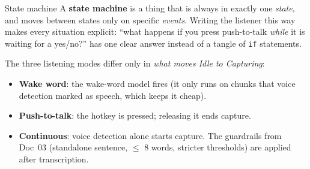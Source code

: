 \documentclass[11pt,a4paper]{article}
\begin{document}
\begin{concept}{State machine}
A \textbf{state machine} is a thing that is always in exactly one \emph{state}, and moves
between states only on specific \emph{events}. Writing the listener this way makes every
situation explicit: ``what happens if you press push-to-talk \emph{while} it is waiting for a
yes/no?'' has one clear answer instead of a tangle of \texttt{if} statements.
\end{concept}

\begin{center}
\end{center}

\noindent The three listening modes differ only in \emph{what moves Idle to Capturing}:
\begin{itemize}[nosep]
  \item \textbf{Wake word}: the wake-word model fires (it only runs on chunks that voice
        detection marked as speech, which keeps it cheap).
  \item \textbf{Push-to-talk}: the hotkey is pressed; releasing it ends capture.
  \item \textbf{Continuous}: voice detection alone starts capture. The guardrails from Doc~03
        (standalone sentence, $\le$ 8 words, stricter thresholds) are applied after transcription.
\end{itemize}
\end{document}
